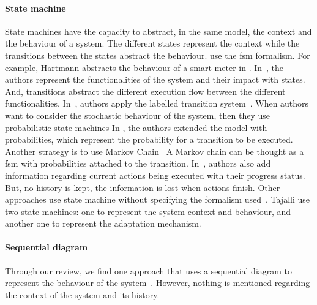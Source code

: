 \paragraph{State machine}
State machines have the capacity to abstract, in the same model, the context and the behaviour of a system.
The different states represent the \gls{context} while the transitions between the states abstract the \gls{behaviour}.
\cite{DBLP:conf/smartgridsec/0001FKNT14, DBLP:conf/icse/IftikharW14a, DBLP:conf/icse/ArcainiRS15, DBLP:conf/rv/ArcainiGR11, DBLP:conf/icse/GhezziPST13} use the \gls{fsm} formalism.
For example, Hartmann \etal abstracts the behaviour of a smart meter in \cite{DBLP:conf/smartgridsec/0001FKNT14}.
In~\cite{DBLP:conf/icse/GhezziPST13}, the authors represent the functionalities of the system and their impact with states.
And, transitions abstract the different execution flow between the different functionalities.
In~\cite{DBLP:conf/icse/BarbosaLMJ17, DBLP:journals/computing/BencomoBGBI13}, authors apply the labelled transition system~\cite{DBLP:journals/cacm/Keller76}.
When authors want to consider the stochastic \gls{behaviour} of the system, then they use probabilistic state machines
In \cite{DBLP:conf/icse/BarbosaLMJ17}, the authors extended  the model with probabilities, which represent the probability for a transition to be executed.
Another strategy is to use Markov Chain~\cite{DBLP:conf/sigsoft/MorenoCGS15, DBLP:conf/kbse/FilieriGLM11, DBLP:conf/dagstuhl/GhezziS10, DBLP:conf/icse/DuarteMS18}
A Markov chain can be thought as a \gls{fsm} with probabilities attached to the transition.
In~\cite{DBLP:conf/sigsoft/MorenoCGS15}, authors also add information regarding current \glspl{action} being executed with their progress status.
But, no history is kept, the information is lost when \glspl{action} finish.
Other approaches use state machine without specifying the formalism used~\cite{DBLP:conf/wetice/DjoudiBZ14, DBLP:conf/aosd/ZhangGC09, DBLP:conf/kbse/TajalliGEM10}.
Tajalli \etal use two state machines: one to represent the system \gls{context} and \gls{behaviour}, and another one to represent the adaptation mechanism.

\paragraph{Sequential diagram}
Through our review, we find one approach that uses a sequential diagram to represent the \gls{behaviour} of the system~\cite{DBLP:conf/icse/TaharaOH17}.
However, nothing is mentioned regarding the context of the system and its history.
	
